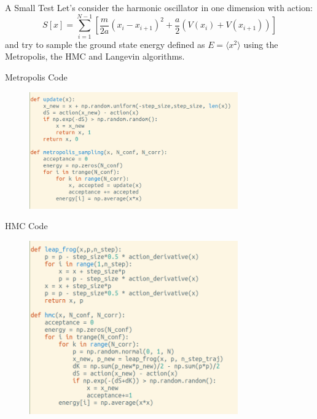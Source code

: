 \documentclass[10pt]{beamer}
\begin{document}
\begin{frame}{A Small Test}
    Let's consider the harmonic oscillator in one dimension with action:
    \[
        S[x] = \sum_{i=1}^{N-1}\left[\frac{m}{2a}(x_i - x_{i+1})^2 + \frac{a}{2}\left(V(x_i) + V(x_{i+1})\right)\right]
    \]
    and try to sample the ground state energy defined as $E=\langle x^2\rangle$ using the Metropolis, the HMC and Langevin algorithms. 
\end{frame}

\begin{frame}{Metropolis Code}
    \begin{figure}
        \includegraphics[width=0.8\textwidth]{metropolis_code.png}
    \end{figure}
\end{frame}

\begin{frame}{HMC Code}
    \begin{figure}
        \includegraphics[width=0.8\textwidth]{hmc_code.png}
    \end{figure}
\end{frame}
\end{document}
